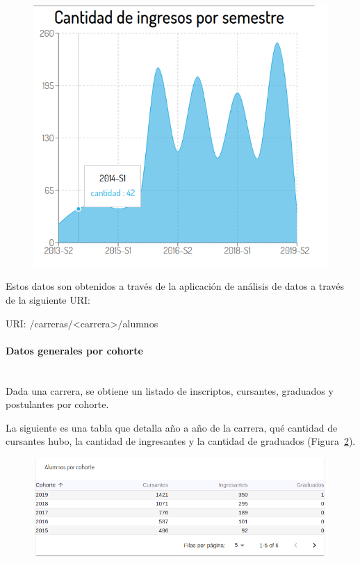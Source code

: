 \begin{figure}[H]
  \centering
    \includegraphics[scale=0.4]{images/seguimiento-academico/sa-ingresossemestre.png}
  \label{fig:sa-ingresos-semestre}
\end{figure}

Estos datos son obtenidos a través de la aplicación de análisis de datos a través de la siguiente URI:

URI: /carreras/<carrera>/alumnos \\



\paragraph{Datos generales por cohorte}\mbox{}\\

Dada una carrera, se obtiene un listado de inscriptos, cursantes, graduados y postulantes por cohorte.

La siguiente es una tabla que detalla año a año de la carrera, qué cantidad de cursantes hubo, la cantidad de ingresantes y la cantidad de graduados  (Figura~\ref{fig:sa-alumnos-cohorte}).

\begin{figure}[H]
  \centering
    \includegraphics[scale=0.4]{images/seguimiento-academico/sa-alumnos-cohorte.png}
  \label{fig:sa-alumnos-cohorte}
\end{figure}

